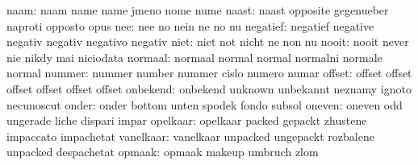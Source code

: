                     naam: naam                      name
                           name                      jmeno
                           nome                      nume
                    naast: naast                     opposite
                           gegenueber                naproti
                           opposto                   opus
                      nee: nee                       no
                           nein                      ne
                           no                        nu
                 negatief: negatief                  negative
                           negativ                   negativ
                           negativo                  negativ
                     niet: niet                      not
                           nicht                     ne
                           non                       nu
                    nooit: nooit                     never
                           nie                       nikdy
                           mai                       niciodata
                  normaal: normaal                   normal
                           normal                    normalni
                           normale                   normal
                   nummer: nummer                    number
                           nummer                    cislo
                           numero                    numar
                   offset: offset                    offset
                           offset                    offset
                           offset                    offset
                 onbekend: onbekend                  unknown
                           unbekannt                 neznamy
                           ignoto                    necunoscut
                    onder: onder                     bottom
                           unten                     spodek
                           fondo                     subsol
                   oneven: oneven                    odd
                           ungerade                  liche
                           dispari                   impar
                 opelkaar: opelkaar                  packed
                           gepackt                   zhustene
                           impaccato                 impachetat
                vanelkaar: vanelkaar                 unpacked
                           ungepackt                 rozbalene
                           unpacked                  despachetat
                   opmaak: opmaak                    makeup
                           umbruch                   zlom
